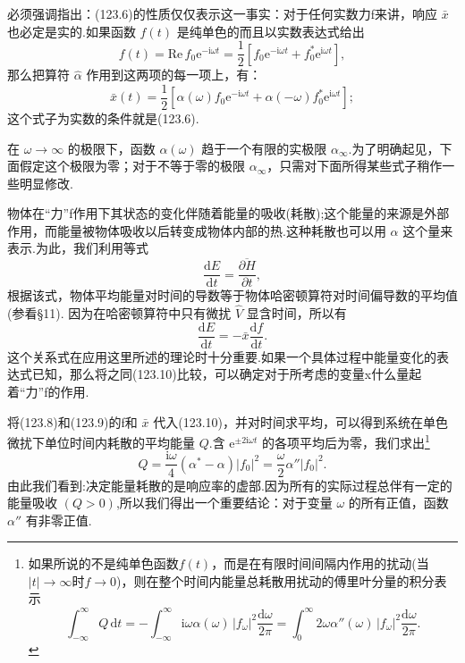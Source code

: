 必须强调指出：(123.6)的性质仅仅表示这一事实：对于任何实数力f来讲，响应 $\bar{x}$ 也必定是实的.如果函数 $f(t)$ 是纯单色的而且以实数表达式给出
\begin{equation}
  f(t)=\mathrm{Re}\,f_0\mathrm{e}^{-\mathrm{i}\omega t}
  =\frac{1}{2}\left[f_0\mathrm{e}^{-\mathrm{i}\omega t}
  +f_0^*\mathrm{e}^{\mathrm{i}\omega t}\right],
\end{equation}
那么把算符 $\hat{\alpha}$ 作用到这两项的每一项上，有：
\begin{equation}
  \bar{x}(t)=\frac{1}{2}\left[\alpha(\omega)f_0\mathrm{e}^{-\mathrm{i}\omega t}
  +\alpha(-\omega)f_0^*\mathrm{e}^{\mathrm{i}\omega t}\right];
\end{equation}
这个式子为实数的条件就是(123.6).

在 $\omega\to\infty$ 的极限下，函数 $\alpha(\omega)$ 趋于一个有限的实极限 $\alpha_\infty$.为了明确起见，下面假定这个极限为零；对于不等于零的极限 $\alpha_\infty$，只需对下面所得某些式子稍作一些明显修改.

物体在“力”f作用下其状态的变化伴随着能量的吸收(耗散);这个能量的来源是外部作用，而能量被物体吸收以后转变成物体内部的热.这种耗散也可以用 $\alpha$ 这个量来表示.为此，我们利用等式
\begin{equation*}
  \frac{\mathrm{d}E}{\mathrm{d}t}
  =\overline{\frac{\partial H}{\partial t}},
\end{equation*}
根据该式，物体平均能量对时间的导数等于物体哈密顿算符对时间偏导数的平均值(参看§11). 因为在哈密顿算符中只有微扰 $\hat{V}$ 显含时间，所以有
\begin{equation}
  \frac{\mathrm{d}E}{\mathrm{d}t}=-\bar{x}\frac{\mathrm{d}f}{\mathrm{d}t}.
\end{equation}
这个关系式在应用这里所述的理论时十分重要.如果一个具体过程中能量变化的表达式已知，那么将之同(123.10)比较，可以确定对于所考虑的变量x什么量起着“力”f的作用.

将(123.8)和(123.9)的f和 $\bar{x}$ 代入(123.10)，并对时间求平均，可以得到系统在单色微扰下单位时间内耗散的平均能量 $Q$.含 $\mathrm{e}^{\pm 2\mathrm{i}\omega t}$ 的各项平均后为零，我们求出\footnote{如果所说的不是纯单色函数$f(t)$，而是在有限时间间隔内作用的扰动(当$|t|\to\infty$时$f\to0$)，则在整个时间内能量总耗散用扰动的傅里叶分量的积分表示
\begin{equation*}
  \int_{-\infty}^{\infty}Q\,\mathrm{d}t
  =-\int_{-\infty}^{\infty}\mathrm{i}\omega\alpha(\omega)\,|f_\omega|^2\frac{\mathrm{d}\omega}{2\pi}
  =\int_0^{\infty}2\omega\alpha''(\omega)\,|f_\omega|^2\frac{\mathrm{d}\omega}{2\pi}.
\end{equation*}}
\begin{equation}
  Q=\frac{\mathrm{i}\omega}{4}(\alpha^*-\alpha)|f_0|^2
  =\frac{\omega}{2}\alpha''|f_0|^2.
\end{equation}
由此我们看到:决定能量耗散的是响应率的虚部.因为所有的实际过程总伴有一定的能量吸收 $(Q>0)$,所以我们得出一个重要结论：对于变量 $\omega$ 的所有正值，函数 $\alpha''$ 有非零正值.

